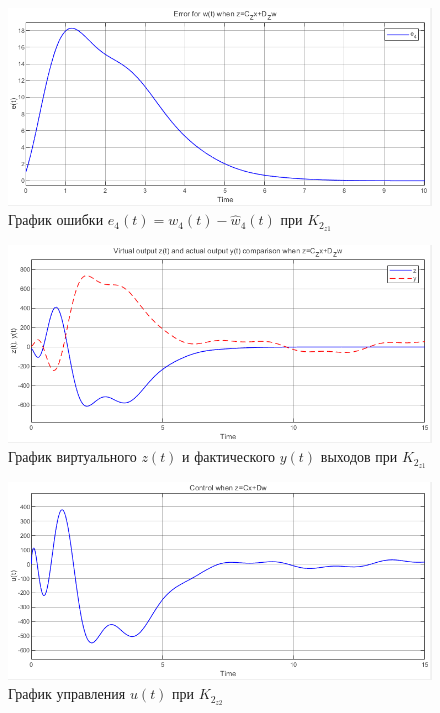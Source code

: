 \documentclass[a4paper, 12pt]{article}
\begin{document}
    \begin{figure}[H]
        \centering
        \includegraphics[scale=0.75]{3task_we4czdz.png}
        \captionsetup{skip=0pt}
        \caption{График ошибки $e_4(t)=w_4(t)-\hat{w}_4(t)$ при $K_{2_{z1}}$}
        \label{fig:3task_we4czdz}
    \end{figure}
    \begin{figure}[H]
        \centering
        \includegraphics[scale=0.75]{3task_zczdz.png}
        \captionsetup{skip=0pt}
        \caption{График виртуального $z(t)$ и фактического $y(t)$ выходов при $K_{2_{z1}}$}
        \label{fig:3task_zczdz}
    \end{figure}
    \begin{figure}[H]
        \centering
        \includegraphics[scale=0.75]{3task_ucd.png}
        \captionsetup{skip=0pt}
        \caption{График управления $u(t)$ при $K_{2_{z2}}$}
        \label{fig:3task_ucd}
    \end{figure}
\end{document}
